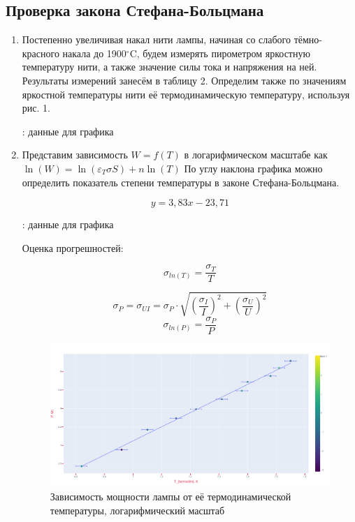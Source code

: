 \documentclass[15pt,a5paper,reqno]{article}
\begin{document}
\subsection{Проверка закона Стефана-Больцмана}
\begin{enumerate}

\item Постепенно увеличивая накал нити лампы, начиная со слабого тёмно-красного накала до 1900$^{\circ}$C, будем измерять пирометром яркостную температуру нити, а также значение силы тока и напряжения на ней. Результаты измерений занесём в таблицу 2. Определим также по значениям яркостной температуры нити её термодинамическую температуру, используя рис. 1.
    
\begin{table}[h!]
        \centering
        
        \caption{: данные для графика}
    \label{tb_2}
\end{table}

\item Представим зависимость $W=f(T)$ в логарифмическом масштабе как $\ln(W) = \ln(\varepsilon_T \sigma S) + n \ln(T)$ По углу наклона графика можно определить показатель степени температуры в законе Стефана-Больцмана. 

\[ y = 3,83x - 23,71 \] 

\begin{table}[h!]
    \centering
    
    \caption{: данные для графика}
\label{tb_3}
\end{table}

Оценка прогрешностей:

\[  \sigma_{ln(T)} = \frac{\sigma_T}{T} \]

\[ \sigma_{P} = \sigma_{UI} = \sigma_P \cdot \sqrt{\left( \frac{\sigma_I}{I} \right)^{2}  +  \left( \frac{\sigma_U}{U} \right)^{2}} \]
\[ \sigma_{ln(P)} = \frac{\sigma_P}{P}\]


\begin{figure}[h]
    \centering
    \includegraphics[width=\textwidth]{pics/graph_5_8_1.png}
    \caption{Зависимость мощности лампы от её термодинамической температуры, логарифмический масштаб}
    \label{graph}
\end{figure}


\end{enumerate}
\end{document}
